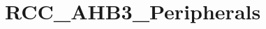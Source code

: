 \hypertarget{group___r_c_c___a_h_b3___peripherals}{}\section{R\+C\+C\+\_\+\+A\+H\+B3\+\_\+\+Peripherals}
\label{group___r_c_c___a_h_b3___peripherals}
